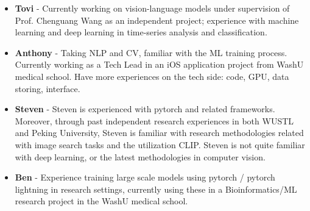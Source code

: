 \documentclass[10pt,twocolumn,letterpaper]{article}
\begin{document}
\begin{itemize}
    \item \textbf{Tovi} - Currently working on vision-language models under supervision of Prof. Chenguang Wang as an independent project; experience with machine learning and deep learning in time-series analysis and classification.
    \item \textbf{Anthony} - Taking NLP and CV, familiar with the ML training process. Currently working as a Tech Lead in an iOS application project from WashU medical school. Have more experiences on the tech side: code, GPU, data storing, interface.
    \item \textbf{Steven} - Steven is experienced with pytorch and related frameworks. Moreover, through past independent research experiences in both WUSTL and Peking University, Steven is familiar with research methodologies related with image search tasks and the utilization CLIP. Steven is not quite familiar with deep learning, or the latest methodologies in computer vision.
    \item \textbf{Ben} - Experience training large scale models using pytorch / pytorch lightning in research settings, currently using these in a Bioinformatics/ML research project in the WashU medical school.
\end{itemize}



{\small


}
\end{document}
